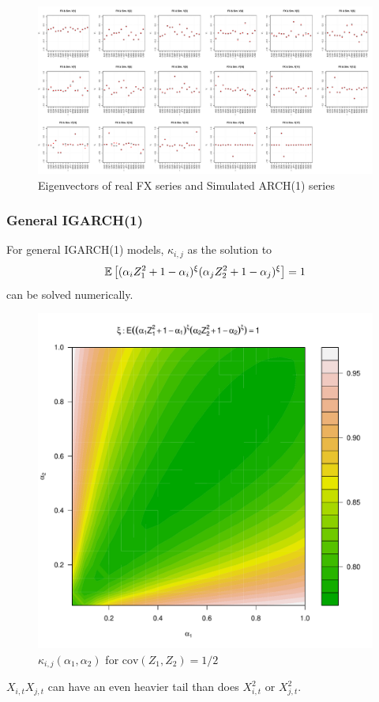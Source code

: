 \documentclass{beamer}
\begin{document}
\begin{frame}
  \begin{figure}[htb!]
    \centering
    \includegraphics[scale=0.2]{FX_ARCH_eigenvectors.pdf}
    \caption{\tiny Eigenvectors of real FX series and Simulated ARCH(1) series}
  \end{figure}
\end{frame}

\begin{frame}
  \frametitle{General IGARCH(1)}
  For general IGARCH(1) models, $\kappa_{i,j}$ as the solution to
  \begin{equation*}
    \mathbb{E} \left[
      (
      \alpha_i Z_1^2 + 1 - \alpha_i
      )^\xi
      (
      \alpha_j Z_2^2 + 1 - \alpha_j
      )^\xi\right] = 1
  \end{equation*}
  can be solved numerically.
  \begin{figure}
    \begin{center}
      \includegraphics[scale=0.2]{igarch_rho0dot5.pdf}      
    \end{center}
    \label{fig:xi_rho0.5}
    \caption{$\kappa_{i,j}(\alpha_1, \alpha_2)$ for $\text{cov}(Z_1, Z_2) = 1/2$}
  \end{figure}
  $X_{i,t} X_{j,t}$ can have an even heavier tail than does $X_{i,t}^2$ or $X_{j,t}^2$.
\end{frame}
\end{document}
